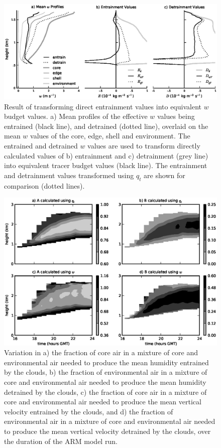 \documentclass[12pt]{article}
\begin{document}
\begin{figure}[t]
  \noindent\includegraphics[width=39pc]{./figures/reynolds_correction_w}
  \caption{Result of transforming direct entrainment values into 
  equivalent $w$ budget values.  a) Mean profiles of the effective $w$ 
  values being entrained (black line), and detrained (dotted line), 
  overlaid on the mean $w$ values of the core, edge, shell and 
  environment.  The entrained and detrained $w$ values are used to 
  transform directly calculated values of b) entrainment and c) 
  detrainment (grey line) into equivalent tracer budget values 
  (black line).  The entrainment and detrainment values transformed 
  using $q_t$ are shown for comparison (dotted lines).}
  \label{fig:Reynolds_correction_w}
\end{figure}

\begin{figure}[t]
  \noindent\includegraphics[width=39pc]{./figures/shell_variability}
  \caption{Variation in a) the fraction of core air in a mixture of core 
  and environmental air needed to produce the mean humidity entrained by 
  the clouds, b) the fraction of environmental air in a mixture of core 
  and environmental air needed to produce the mean humidity detrained by 
  the clouds, c) the fraction of core air in a mixture of core and 
  environmental air needed to produce the mean vertical velocity 
  entrained by the clouds, and d) the fraction of environmental air in 
  a mixture of core and environmental air needed to produce the mean 
  vertical velocity detrained by the clouds, over the duration of the 
  ARM model run.
  }
  \label{fig:shell_variability}
\end{figure}
\end{document}
